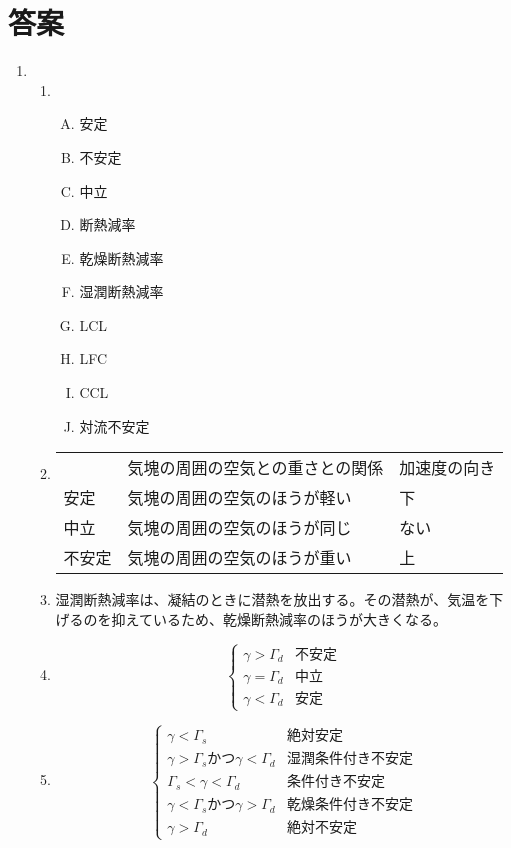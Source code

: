 \documentclass{jsarticle}
\newenvironment{problems}
{
  \renewcommand\labelenumi{\doublebox{\arabic{enumi}}}
  \begin{enumerate}
}{
  \end{enumerate}
  \renewcommand\labelenumi{\arabic{enumi}.}
}
\begin{document}
\section{答案}
\begin{problems}
\item 
	\begin{enumerate}[(1)]
  \item
  	\begin{enumerate}[(A)]
    \item 安定
    \item 不安定
    \item 中立
    \item 断熱減率
    \item 乾燥断熱減率
    \item 湿潤断熱減率
    \item LCL
    \item LFC
    \item CCL
    \item 対流不安定
    \end{enumerate}

\item

\begin{table}[H]
\begin{tabular}{lll}
    & 気塊の周囲の空気との重さとの関係 & 加速度の向き \\
安定  & 気塊の周囲の空気のほうが軽い   & 下      \\
中立  & 気塊の周囲の空気のほうが同じ   & ない    \\
不安定 & 気塊の周囲の空気のほうが重い   & 上     
\end{tabular}
\end{table}
  \item
湿潤断熱減率は、凝結のときに潜熱を放出する。その潜熱が、気温を下げるのを抑えているため、乾燥断熱減率のほうが大きくなる。
  \item
  \begin{equation}
  \begin{cases}
    \gamma > \Gamma_d & 不安定\\
  \gamma = \Gamma_d & 中立\\
  \gamma < \Gamma_d & 安定
  \end{cases}
  \end{equation}
\item
  \begin{equation}
  \begin{cases}
    \gamma < \Gamma_s & 絶対安定\\
    \gamma > \Gamma_s かつ\gamma < \Gamma_d & 湿潤条件付き不安定\\
  \Gamma_s < \gamma < \Gamma_d & 条件付き不安定\\
  \gamma < \Gamma_s かつ \gamma > \Gamma_d & 乾燥条件付き不安定\\
  \gamma > \Gamma_d & 絶対不安定
  \end{cases}
  \end{equation}


\end{enumerate}
\end{problems}
\end{document}
